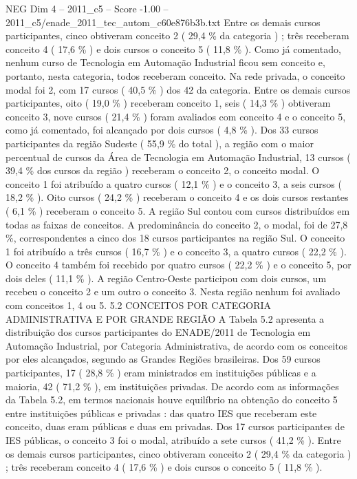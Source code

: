 \begin{textsample}{NEG Dim 4 – 2011\_c5 – Score -1.00 – 2011\_c5/enade\_2011\_tec\_autom\_c60e876b3b.txt}
Entre os demais cursos participantes, cinco obtiveram conceito 2 ( 29,4 \% da categoria ) ; três receberam conceito 4 ( 17,6 \% ) e dois cursos o conceito 5 ( 11,8 \% ).
Como já comentado, nenhum curso de Tecnologia em Automação Industrial ficou sem conceito e, portanto, nesta categoria, todos receberam conceito.
Na rede privada, o conceito modal foi 2, com 17 cursos ( 40,5 \% ) dos 42 da categoria.
Entre os demais cursos participantes, oito ( 19,0 \% ) receberam conceito 1, seis ( 14,3 \% ) obtiveram conceito 3, nove cursos ( 21,4 \% ) foram avaliados com conceito 4 e o conceito 5, como já comentado, foi alcançado por dois cursos ( 4,8 \% ).
Dos 33 cursos participantes da região Sudeste ( 55,9 \% do total ), a região com o maior percentual de cursos da Área de Tecnologia em Automação Industrial, 13 cursos ( 39,4 \% dos cursos da região ) receberam o conceito 2, o conceito modal.
O conceito 1 foi atribuído a quatro cursos ( 12,1 \% ) e o conceito 3, a seis cursos ( 18,2 \% ).
Oito cursos ( 24,2 \% ) receberam o conceito 4 e os dois cursos restantes ( 6,1 \% ) receberam o conceito 5.
A região Sul contou com cursos distribuídos em todas as faixas de conceitos.
A predominância do conceito 2, o modal, foi de 27,8 \%, correspondentes a cinco dos 18 cursos participantes na região Sul.
O conceito 1 foi atribuído a três cursos ( 16,7 \% ) e o conceito 3, a quatro cursos ( 22,2 \% ).
O conceito 4 também foi recebido por quatro cursos ( 22,2 \% ) e o conceito 5, por dois deles ( 11,1 \% ).
A região Centro-Oeste participou com dois cursos, um recebeu o conceito 2 e um outro o conceito 3.
Nesta região nenhum foi avaliado com conceitos 1, 4 ou 5. 5.2 CONCEITOS POR CATEGORIA ADMINISTRATIVA E POR GRANDE REGIÃO A Tabela 5.2 apresenta a distribuição dos cursos participantes do ENADE/2011 de Tecnologia em Automação Industrial, por Categoria Administrativa, de acordo com os conceitos por eles alcançados, segundo as Grandes Regiões brasileiras.
Dos 59 cursos participantes, 17 ( 28,8 \% ) eram ministrados em instituições públicas e a maioria, 42 ( 71,2 \% ), em instituições privadas.
De acordo com as informações da Tabela 5.2, em termos nacionais houve equilíbrio na obtenção do conceito 5 entre instituições públicas e privadas : das quatro IES que receberam este conceito, duas eram públicas e duas em privadas.
Dos 17 cursos participantes de IES públicas, o conceito 3 foi o modal, atribuído a sete cursos ( 41,2 \% ).
Entre os demais cursos participantes, cinco obtiveram conceito 2 ( 29,4 \% da categoria ) ; três receberam conceito 4 ( 17,6 \% ) e dois cursos o conceito 5 ( 11,8 \% ).

\end{textsample}

